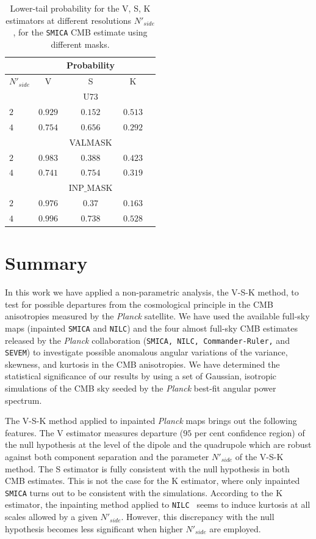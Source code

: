 \begin{table}
\centering
\caption{Lower-tail probability for the V, S, K estimators at different resolutions $N'_{side}$, for the \texttt{SMICA} CMB estimate using different masks.}
\label{table:3}
\begin{tabular}{@{}lcccc}
\hline 
  & & Probability & \\
\hline  
$N'_{side}$ & V & S & K \\ 
\hline  
 & & U73 & \\
$2$ & $ 0.929 $ & $ 0.152 $ & $ 0.513 $ \\ 
$4$ & $ 0.754 $ & $ 0.656 $ & $ 0.292 $  \\
 & & VALMASK & \\
$2$ & $ 0.983 $ & $ 0.388 $ & $ 0.423 $ \\ 
$4$ & $ 0.741 $ & $ 0.754 $ & $ 0.319 $  \\
 & & INP$\_$MASK & \\
$2$ & $ 0.976 $ & $ 0.37 $ & $ 0.163 $ \\ 
$4$ & $ 0.996 $ & $ 0.738 $ & $ 0.528 $  \\
\end{tabular} 
\end{table}


\section{Summary}
\label{s:summary}

In this work we have applied a non-parametric analysis, the V-S-K method, to test for possible departures from the cosmological principle in the CMB anisotropies measured by the \textit{Planck} satellite. We have used the available full-sky maps (inpainted \texttt{SMICA} and \texttt{NILC}) and the four almost full-sky CMB estimates released by the \textit{Planck} collaboration (\texttt{SMICA, NILC, Commander-Ruler,} and \texttt{SEVEM}) to investigate possible anomalous angular variations of the variance, skewness, and kurtosis in the CMB anisotropies. We have determined the statistical significance of our results by using a set of Gaussian, isotropic simulations of the CMB sky seeded by the \textit{Planck} best-fit angular power spectrum.    

The V-S-K method applied to inpainted \textit{Planck} maps brings out the following features. The V estimator measures departure ($95$ per cent confidence region) of the null hypothesis at the level of the dipole and the quadrupole which are robust against both component separation and the parameter $ N'_{side} $ of the V-S-K method. The S estimator is fully consistent with the null hypothesis in both CMB estimates. This is not the case for the K estimator, where only inpainted \texttt{SMICA} turns out to be consistent with the simulations. According to the K estimator, the inpainting method applied to \texttt{NILC } seems to induce kurtosis at all scales allowed by a given $ N'_{side} $. However, this discrepancy with the null hypothesis becomes  less significant when higher $ N'_{side} $ are employed. 

